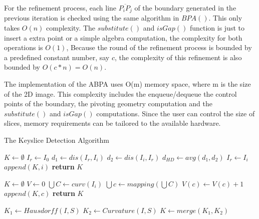 For the refinement process, each line $\overline{P_iP_j}$ of the boundary generated
in the previous iteration is checked using the same algorithm in $BPA()$. This only
takes $O(n)$ complexity. The $substitute()$ and $isGap()$ function is just to insert
a extra point or a simple algebra computation, the complexity for both operations is 
$O(1)$, Because the round of the refinement process is bounded by a predefined constant 
number, say $c$, the complexity of this refinement is also bounded by $O(c*n) = O(n)$. 

The implementation of the ABPA uses O(m) memory space, where m is the size of the 2D image.
This complexity includes the enqueue/dequeue the control points of the boundary, the 
pivoting geometry computation and the $substitute()$ and $isGap()$ computations. Since
the user can control the size of slices, memory requirements can be tailored to the
available hardware. 

\begin{algorithm}
\caption{The Keyslice Detection Algorithm}
\label{alg.KSD}
\begin{algorithmic}[1]
  \State $K \leftarrow \emptyset$  
  \State $I_r \leftarrow I_0$
    \State $d_1 \leftarrow dis(I_r, I_i) $
    \State $d_2 \leftarrow dis(I_i, I_r) $
    \State $d_{HD} \leftarrow avg(d_1, d_2) $ 
       \State $I_r \leftarrow I_i$  
       \State $ append(K, i) $
    \EndIf
  \EndFor
  \State \textbf{return} $K$
\EndProcedure

  \State $K \leftarrow \emptyset$  
  \State $V \leftarrow 0$ 
     \State $\bigcup{C} \leftarrow curv(I_i)$ 
     \State $\bigcup{c} \leftarrow mapping(\bigcup{C}) $ 
        \State $V(c) \leftarrow V(c) + 1$ 
     \EndFor
  \EndFor
       
	\State $append(K, c)$
     \EndIf
  \EndFor
  \State \textbf{return} $K$
\EndProcedure

\State $K_1 \leftarrow Hausdorff(I, S)$ 
\State $K_2 \leftarrow Curvature(I, S)$ 
\State $K \leftarrow merge(K_1, K_2)$
\EndProcedure
\end{algorithmic}
\end{algorithm}

